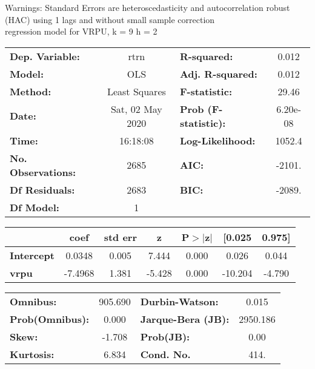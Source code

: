 Warnings: \newline
 [1] Standard Errors are heteroscedasticity and autocorrelation robust (HAC) using 1 lags and without small sample correction\\ 

regression model for VRPU, k = 9 h = 2\begin{center}
\begin{tabular}{lclc}
\toprule
\textbf{Dep. Variable:}    &       rtrn       & \textbf{  R-squared:         } &     0.012   \\
\textbf{Model:}            &       OLS        & \textbf{  Adj. R-squared:    } &     0.012   \\
\textbf{Method:}           &  Least Squares   & \textbf{  F-statistic:       } &     29.46   \\
\textbf{Date:}             & Sat, 02 May 2020 & \textbf{  Prob (F-statistic):} &  6.20e-08   \\
\textbf{Time:}             &     16:18:08     & \textbf{  Log-Likelihood:    } &    1052.4   \\
\textbf{No. Observations:} &        2685      & \textbf{  AIC:               } &    -2101.   \\
\textbf{Df Residuals:}     &        2683      & \textbf{  BIC:               } &    -2089.   \\
\textbf{Df Model:}         &           1      & \textbf{                     } &             \\
\bottomrule
\end{tabular}
\begin{tabular}{lcccccc}
                   & \textbf{coef} & \textbf{std err} & \textbf{z} & \textbf{P$> |$z$|$} & \textbf{[0.025} & \textbf{0.975]}  \\
\midrule
\textbf{Intercept} &       0.0348  &        0.005     &     7.444  &         0.000        &        0.026    &        0.044     \\
\textbf{vrpu}      &      -7.4968  &        1.381     &    -5.428  &         0.000        &      -10.204    &       -4.790     \\
\bottomrule
\end{tabular}
\begin{tabular}{lclc}
\textbf{Omnibus:}       & 905.690 & \textbf{  Durbin-Watson:     } &    0.015  \\
\textbf{Prob(Omnibus):} &   0.000 & \textbf{  Jarque-Bera (JB):  } & 2950.186  \\
\textbf{Skew:}          &  -1.708 & \textbf{  Prob(JB):          } &     0.00  \\
\textbf{Kurtosis:}      &   6.834 & \textbf{  Cond. No.          } &     414.  \\
\bottomrule
\end{tabular}
\end{center}

